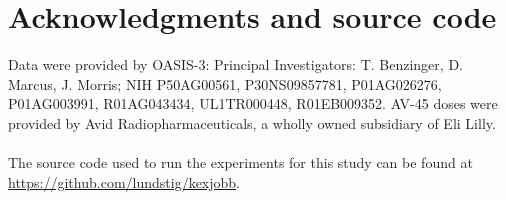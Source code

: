 \documentclass{kththesis}
\begin{document}
\chapter{Acknowledgments and source code}
Data were provided by OASIS-3: Principal Investigators: T. Benzinger, D. Marcus, J. Morris; NIH P50AG00561, P30NS09857781, P01AG026276, P01AG003991, R01AG043434, UL1TR000448, R01EB009352. AV-45 doses were provided by Avid Radiopharmaceuticals, a wholly owned subsidiary of Eli Lilly.

\subsubsection*{}
The source code used to run the experiments for this study can be found at \url{https://github.com/lundstig/kexjobb}.

\printbibliography[heading=bibintoc]

\appendix


\tailmatter
\end{document}
